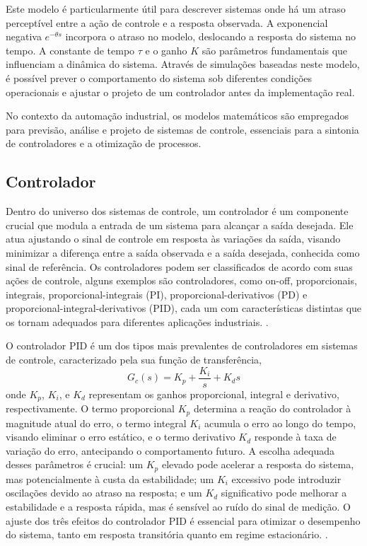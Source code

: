 Este modelo é particularmente útil para descrever sistemas onde há um atraso perceptível entre a ação de controle e a
resposta observada.
A exponencial negativa \( e^{-\theta s} \) incorpora o atraso no modelo, deslocando a resposta do sistema no tempo.
A constante de tempo \( \tau \) e o ganho \( K \) são parâmetros fundamentais que influenciam a dinâmica do sistema.
Através de simulações baseadas neste modelo, é possível prever o comportamento do sistema sob diferentes
condições operacionais e ajustar o projeto de um controlador antes da implementação real.

No contexto da automação industrial, os modelos matemáticos são empregados para previsão, análise e projeto de sistemas
de controle, essenciais para a sintonia de controladores e a otimização de processos.

\subsection{Controlador}

Dentro do universo dos sistemas de controle, um controlador é um componente crucial que modula a entrada de um sistema
para alcançar a saída desejada.
Ele atua ajustando o sinal de controle em resposta às variações da saída, visando minimizar a diferença entre a saída
observada e a saída desejada, conhecida como sinal de referência.
Os controladores podem ser classificados de acordo com suas ações de controle, alguns exemplos são controladores,
como on-off, proporcionais, integrais, proporcional-integrais (PI), proporcional-derivativos (PD) e
proporcional-integral-derivativos (PID), cada um com características distintas que os tornam adequados para diferentes
aplicações industriais. \cite{ogata2010engenharia}.

O controlador PID é um dos tipos mais prevalentes de controladores em sistemas de controle, caracterizado pela sua
função de transferência,
\begin{equation}
    \label{eq:ctrlr}
    G_c(s) = K_p + \frac{K_i}{s} + K_d s
\end{equation}
onde \( K_p \), \( K_i \), e \( K_d \) representam os ganhos proporcional, integral e derivativo, respectivamente.
O termo proporcional \( K_p \) determina a reação do controlador à magnitude atual do erro,
o termo integral \( K_i \) acumula o erro ao longo do tempo, visando eliminar o erro estático,
e o termo derivativo \( K_d \) responde à taxa de variação do erro, antecipando o comportamento futuro.
A escolha adequada desses parâmetros é crucial: um \( K_p \) elevado pode acelerar a resposta do sistema, mas
potencialmente à custa da estabilidade;
um \( K_i \) excessivo pode introduzir oscilações devido ao atraso na resposta;
e um \( K_d \) significativo pode melhorar a estabilidade e a resposta rápida, mas é sensível ao ruído do sinal de
medição.
O ajuste dos três efeitos do controlador PID é essencial para otimizar o desempenho do sistema, tanto em resposta
transitória quanto em regime estacionário. \cite{ogata2010engenharia}.


